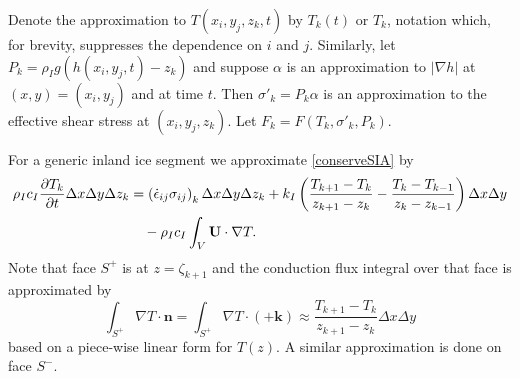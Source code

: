 \documentclass[12pt,final]{amsart}%
\theoremstyle{plain}
\theoremstyle{definition}
\theoremstyle{remark}
\newcommand{\ddt}[1]{\ensuremath{\frac{\partial #1}{\partial t}}}
\def\eps{\epsilon}
\newcommand{\grad}{\nabla}
\newcommand{\khat}{\mathbf{k}}
\newcommand{\nhat}{\mathbf{n}}
\newcommand{\bU}{{\mathbf{U}}}
\begin{document}
Denote the approximation to $T(x_i,y_j,z_k,t)$ by $T_k(t)$ or $T_k$, notation which, for brevity, suppresses the dependence on $i$ and $j$.  Similarly, let $P_k = \rho_I g (h(x_i,y_j,t)-z_k)$ and suppose $\alpha$ is an approximation to $|\grad h|$ at $(x,y)=(x_i,y_j)$ and at time $t$.   Then $\sigma'_k = P_k \alpha$ is an approximation to the effective shear stress at $(x_i,y_j,z_k)$.  Let $F_k = F(T_k,\sigma'_k,P_k)$.

For a generic inland ice segment we approximate \eqref{conserveSIA} by
\begin{align}
\rho_I c_I \ddt{T_k} \Delta x \Delta y \Delta z_k &= \left(\dot\eps_{ij} \sigma_{ij}\right)_k \Delta x \Delta y \Delta z_k + k_I \left(\frac{T_{k+1}-T_k}{z_{k+1}-z_k} - \frac{T_k-T_{k-1}}{z_k-z_{k-1}}\right) \Delta x \Delta y \label{conserveSIAfd} \\
    &\quad - \rho_I c_I \int_V \bU \cdot \grad T. \notag
\end{align}
Note that face $S^+$ is at $z=\zeta_{k+1}$ and the conduction flux integral over that face is approximated by
    $$\int_{S^+} \grad T\cdot \nhat = \int_{S^+} \grad T\cdot(+\khat) \approx \frac{T_{k+1}-T_k}{z_{k+1}-z_k} \Delta x \Delta y$$
based on a piece-wise linear form for $T(z)$.  A similar approximation is done on face $S^-$.
\end{document}
